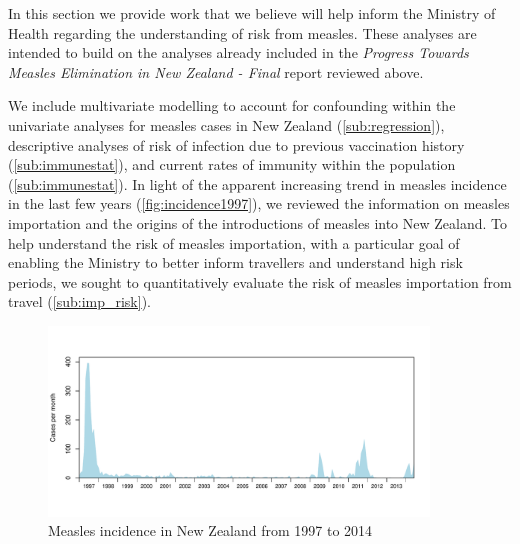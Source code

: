 \documentclass{article}
\begin{document}
In this section we provide work that we believe will help inform the Ministry of Health regarding the understanding of risk from measles. These analyses are intended to build on the analyses already included in the \emph {Progress Towards Measles Elimination in New Zealand - Final} report reviewed above.

We include multivariate modelling to account for confounding within the univariate analyses for measles cases in New Zealand (\autoref{sub:regression}), descriptive analyses of risk of infection due to previous vaccination history (\autoref{sub:immunestat}), and current rates of immunity within the population (\autoref{sub:immunestat}). In light of the apparent increasing trend in measles incidence in the last few years (\autoref{fig:incidence1997}), we reviewed the information on measles importation and the origins of the introductions of measles into New Zealand. To help understand the risk of measles importation, with a particular goal of enabling the Ministry to better inform travellers and understand high risk periods, we sought to quantitatively evaluate the risk of measles importation from travel (\autoref{sub:imp_risk}).

\begin{figure}
     \includegraphics[width=0.9\textwidth]{incidence_1997_2014.pdf}
     \caption{Measles incidence in New Zealand from 1997 to 2014}
     \label{fig:incidence1997}
\end{figure}
\end{document}
